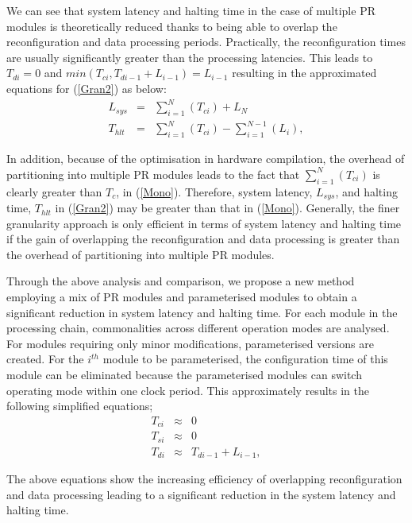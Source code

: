 We can see that system latency and halting time in the case of multiple PR modules is theoretically reduced thanks to being able to overlap the reconfiguration and data processing periods. Practically, the reconfiguration times are usually significantly greater than the processing latencies. This leads to $T_{di} = 0$ and  $min(T_{ci}, T_{di-1}+L_{i-1}) = L_{i-1}$ resulting in the approximated equations for (\ref{Gran2}) as below:
\begin{eqnarray}
\label{Gran3}
L_{sys} &= & \sum_{i = 1}^{N}(T_{ci}) + L_{N}    \nonumber \\
T_{hlt} &=  &\sum_{i = 1}^{N}(T_{ci})  -  \sum_{i = 1}^{N-1}  (L_{i}),
\end{eqnarray}

In addition, because of the optimisation in hardware compilation, the overhead of partitioning into multiple PR modules leads to the fact that $\sum_{i = 1}^{N}(T_{ci})$ is clearly greater than $T_{c}$, in (\ref{Mono}). Therefore, system latency, $L_{sys}$, and halting time, $T_{hlt}$ in (\ref{Gran2}) may be greater than that in (\ref{Mono}).
Generally, the finer granularity approach is only efficient in terms of system latency and halting time if the gain of overlapping the reconfiguration and data processing is greater than the overhead of partitioning into multiple PR modules.

Through the above analysis and comparison, we propose a new method employing a mix of PR modules and parameterised modules to obtain a significant reduction in system latency and halting time. For each module in the processing chain, commonalities across different operation modes are analysed. For modules requiring only minor modifications, parameterised versions are created.
For the $i^{th}$ module to be parameterised, the configuration time of this module can be eliminated because the parameterised modules can switch operating mode within one clock period. This approximately results in the following simplified equations;
\begin{eqnarray}
\label{Pro}
T_{ci} &\approx & 0   \nonumber \\
T_{si} &\approx & 0 \nonumber \\
T_{di} &\approx & T_{di-1} +  L_{i-1},
\end{eqnarray}

The above equations show the increasing efficiency of overlapping reconfiguration and data processing leading to a significant reduction in the system latency and halting time.


